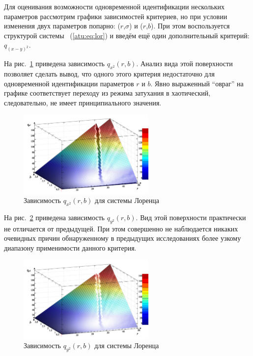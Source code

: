 Для оценивания возможности одновременной идентификации нескольких параметров
рассмотрим графики зависимостей критериев, но при условии
изменения двух параметров попарно: ($r$,$\sigma$) и ($r$,$b$).
При этом воспользуется структурой системы ~(\ref{atu:eq:lor})
и введём ещё один дополнительный критерий: $q_{(x-y)^2}$.

На рис.~\ref{atu:f:lor_qx2_r_b} приведена зависимость
$q_{x^2}(r,b)$.
Анализ вида этой поверхности позволяет сделать вывод,
что одного этого критерия недостаточно для
одновременной идентификации параметров $r$ и $b$.
Явно выраженный ``овраг'' на графике соответствует
переходу из режима затухания в хаотический,
следовательно, не имеет принципиального значения.

\begin{figure}[ht!]
  \centerline{  \includegraphics[width=0.60\textwidth]{p/cha/lor/q2d/lor_qx2_r_b.png}  }
  \caption{Зависимость $q_{x^2}(r,b)$ для системы Лоренца}
  \label{atu:f:lor_qx2_r_b}
\end{figure}


На рис.~\ref{atu:f:lor_qy2_r_b} приведена зависимость
$q_{y^2}(r,b)$. Вид этой поверхности практически не отличается от предыдущей.
При этом совершенно не наблюдается никаких очевидных причин обнаруженному
в предыдущих исследованиях
более узкому диапазону применимости данного критерия.

\begin{figure}[ht!]
  \centerline{  \includegraphics[width=0.60\textwidth]{p/cha/lor/q2d/lor_qy2_r_b.png}  }
  \caption{Зависимость $q_{y^2}(r,b)$ для системы Лоренца}
  \label{atu:f:lor_qy2_r_b}
\end{figure}

